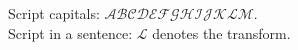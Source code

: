 \documentclass{article}
\begin{document}
Script capitals: $\mathscr{ABCDEFGHIJKLM}$.\\
Script in a sentence: $\mathscr{L}$ denotes the transform.
\end{document}
